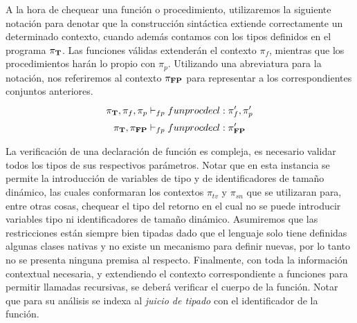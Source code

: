 
A la hora de chequear una función o procedimiento, utilizaremos la siguiente notación para denotar que la construcción sintáctica extiende correctamente un determinado contexto, cuando además contamos con los tipos definidos en el programa $\pi_{\mathbf{T}}$.
Las funciones válidas extenderán el contexto $\pi_{f}$, mientras que los procedimientos harán lo propio con $\pi_{p}$.
Utilizando una abreviatura para la notación, nos referiremos al contexto $\pi_{\mathbf{FP}}$ para representar a los correspondientes conjuntos anteriores.
\begin{gather*}
\PI{T}, \pi_{f}, \pi_{p} \DASH{fp} funprocdecl : \pi'_{f}, \pi'_{p}
\\
\PI{T}, \PI{FP} \DASH{fp} funprocdecl : \PI{FP}'
\end{gather*}

La verificación de una declaración de función es compleja, es necesario validar todos los tipos de sus respectivos parámetros.
Notar que en esta instancia se permite la introducción de variables de tipo y de identificadores de tamaño dinámico, las cuales
conformaran los contextos $\pi_{tv}$ y $\pi_{sn}$ que se utilizaran para, entre otras cosas, chequear el tipo del retorno en el cual no se puede introducir variables tipo ni identificadores de tamaño dinámico.
Asumiremos que las restricciones están siempre bien tipadas dado que el lenguaje solo tiene definidas algunas clases nativas y no existe un mecanismo para definir nuevas, por lo tanto no se presenta ninguna premisa al respecto.
Finalmente, con toda la información contextual necesaria, y extendiendo el contexto correspondiente a funciones para permitir llamadas recursivas, se deberá verificar el cuerpo de la función. Notar que para su análisis se indexa al \textit{juicio de tipado} con el identificador de la función.

